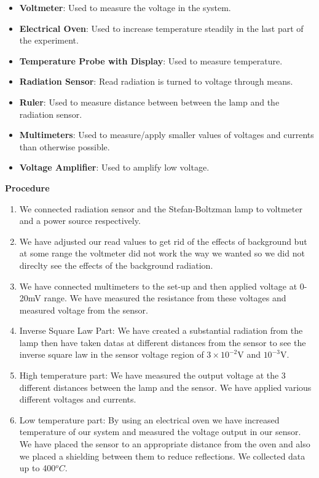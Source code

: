 \documentclass[10pt,a4paper]{article}
\begin{document}
{\begin{itemize}
	\item \textbf{Voltmeter}: Used to measure the voltage in the system.
	\item \textbf{Electrical Oven}: Used to increase temperature steadily in the last part of the experiment.
	\item \textbf{Temperature Probe with Display}: Used to measure temperature.
	\item \textbf{Radiation Sensor}: Read radiation is turned to voltage through means.
	\item \textbf{Ruler}: Used to measure distance between between the lamp and the radiation sensor.
	\item \textbf{Multimeters}: Used to measure/apply smaller values of voltages and currents than otherwise possible.
	\item \textbf{Voltage Amplifier}: Used to amplify low voltage.
	\\[\baselineskip]
\end{itemize}
\textbf{Procedure}
\\[\baselineskip]
\begin{enumerate}
	\item We connected radiation sensor and the Stefan-Boltzman lamp to voltmeter and a power source respectively.
	\item We have adjusted our read values to get rid of the effects of background but at some range the voltmeter did not work the way we wanted so we did not direclty see the effects of the background radiation.
	\item We have connected multimeters to the set-up and then applied voltage at 0-20mV range. We have measured the resistance from these voltages and measured voltage from the sensor.
	\item Inverse Square Law Part: We have created a substantial radiation from the lamp then have taken datas at different distances from the sensor to see the inverse square law in the sensor voltage region of $3\times 10^{-2}$V and $10^{-3}$V.
	\item High temperature part: We have measured the output voltage at the 3 different distances between the lamp and the sensor. We have applied various different voltages and currents.
	\item Low temperature part: By using an electrical oven we have increased temperature of our system and measured the voltage output in our sensor. We have placed the sensor to an appropriate distance from the oven and also we placed a shielding between them to reduce reflections. We collected data up to 400$^oC$.

\end{enumerate}}
\end{document}

